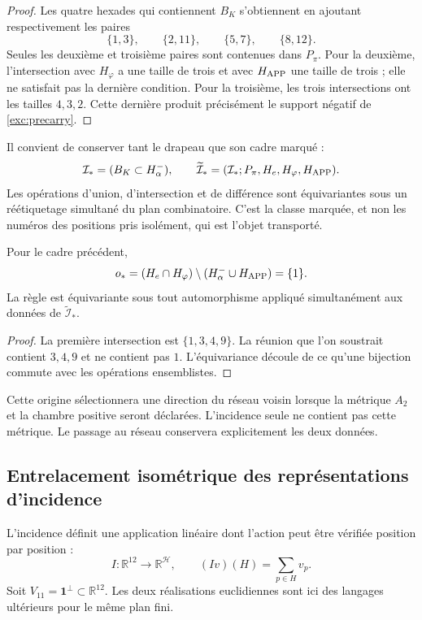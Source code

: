 \begin{proof}
Les quatre hexades qui contiennent $B_K$ s'obtiennent en ajoutant respectivement les paires
\[
 \{1,3\},\qquad\{2,11\},\qquad\{5,7\},\qquad\{8,12\}.
\]
Seules les deuxième et troisième paires sont contenues dans $P_\pi$. Pour la
deuxième, l'intersection avec $H_\varphi$ a une taille de trois et avec
$H_{\rm APP}$ une taille de trois ; elle ne satisfait pas la dernière condition. Pour la
troisième, les trois intersections ont les tailles $4,3,2$. Cette dernière
produit précisément le support négatif de \eqref{exc:precarry}.
\end{proof}

Il convient de conserver tant le drapeau que son cadre marqué :
\[
 \mathcal I_*=(B_K\subset H^-_\alpha),\qquad
 \widetilde{\mathcal I}_*
   =(\mathcal I_*;P_\pi,H_e,H_\varphi,H_{\rm APP}).
\]
Les opérations d'union, d'intersection et de différence sont équivariantes sous un réétiquetage simultané du plan combinatoire. C'est la classe marquée, et non les numéros des positions pris isolément, qui est l'objet transporté.

\begin{lemma}
\label{exc:origen}
Pour le cadre précédent,
\[
 o_*=(H_e\cap H_\varphi)
           \setminus(H^-_\alpha\cup H_{\rm APP})=\{1\}.
\]
La règle est équivariante sous tout automorphisme appliqué simultanément
aux données de $\widetilde{\mathcal I}_*$.
\end{lemma}

\begin{proof}
La première intersection est $\{1,3,4,9\}$. La réunion que l'on soustrait
contient $3,4,9$ et ne contient pas $1$. L'équivariance découle de ce qu'une
bijection commute avec les opérations ensemblistes.
\end{proof}

Cette origine sélectionnera une direction du réseau voisin lorsque la métrique $A_2$ et la chambre positive seront déclarées. L'incidence seule ne contient pas cette métrique. Le passage au réseau conservera explicitement les deux données.



\subsection{Entrelacement isométrique des représentations d'incidence}
\label{exc:entrelazador}

L'incidence définit une application linéaire dont l'action peut être vérifiée
position par position :
\begin{equation}
 I:\mathbb R^{12}\longrightarrow\mathbb R^{\mathcal H},
 \qquad (Iv)(H)=\sum_{p\in H}v_p.
 \label{exc:incidencia}
\end{equation}
Soit $V_{11}=\mathbf1^\perp\subset\mathbb R^{12}$. Les deux réalisations
euclidiennes sont ici des langages ultérieurs pour le même plan fini.

